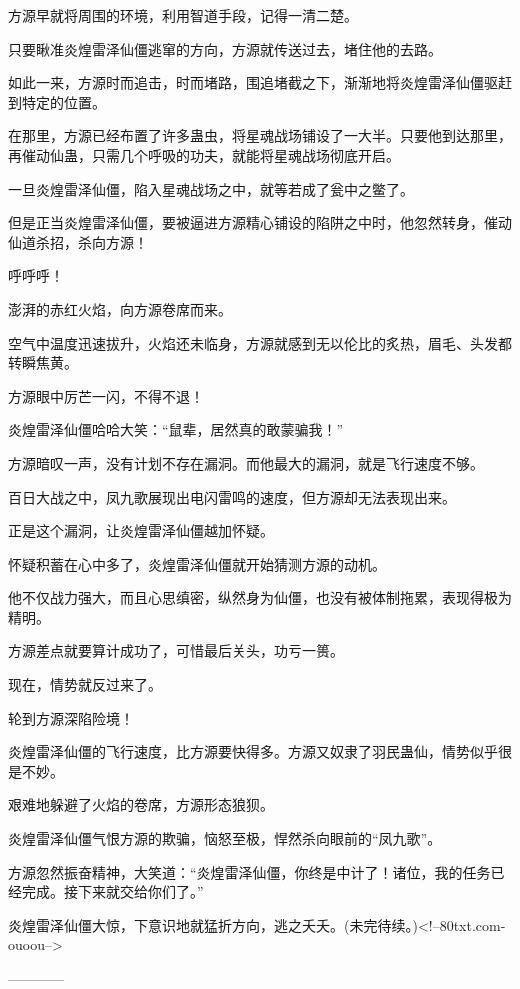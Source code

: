 \begin{this_body}
方源早就将周围的环境，利用智道手段，记得一清二楚。

只要瞅准炎煌雷泽仙僵逃窜的方向，方源就传送过去，堵住他的去路。

如此一来，方源时而追击，时而堵路，围追堵截之下，渐渐地将炎煌雷泽仙僵驱赶到特定的位置。

在那里，方源已经布置了许多蛊虫，将星魂战场铺设了一大半。只要他到达那里，再催动仙蛊，只需几个呼吸的功夫，就能将星魂战场彻底开启。

一旦炎煌雷泽仙僵，陷入星魂战场之中，就等若成了瓮中之鳖了。

但是正当炎煌雷泽仙僵，要被逼进方源精心铺设的陷阱之中时，他忽然转身，催动仙道杀招，杀向方源！

呼呼呼！

澎湃的赤红火焰，向方源卷席而来。

空气中温度迅速拔升，火焰还未临身，方源就感到无以伦比的炙热，眉毛、头发都转瞬焦黄。

方源眼中厉芒一闪，不得不退！

炎煌雷泽仙僵哈哈大笑：“鼠辈，居然真的敢蒙骗我！”

方源暗叹一声，没有计划不存在漏洞。而他最大的漏洞，就是飞行速度不够。

百日大战之中，凤九歌展现出电闪雷鸣的速度，但方源却无法表现出来。

正是这个漏洞，让炎煌雷泽仙僵越加怀疑。

怀疑积蓄在心中多了，炎煌雷泽仙僵就开始猜测方源的动机。

他不仅战力强大，而且心思缜密，纵然身为仙僵，也没有被体制拖累，表现得极为精明。

方源差点就要算计成功了，可惜最后关头，功亏一篑。

现在，情势就反过来了。

轮到方源深陷险境！

炎煌雷泽仙僵的飞行速度，比方源要快得多。方源又奴隶了羽民蛊仙，情势似乎很是不妙。

艰难地躲避了火焰的卷席，方源形态狼狈。

炎煌雷泽仙僵气恨方源的欺骗，恼怒至极，悍然杀向眼前的“凤九歌”。

方源忽然振奋精神，大笑道：“炎煌雷泽仙僵，你终是中计了！诸位，我的任务已经完成。接下来就交给你们了。”

炎煌雷泽仙僵大惊，下意识地就猛折方向，逃之夭夭。(未完待续。)<!--80txt.com-ouoou-->

------------

\end{this_body}

